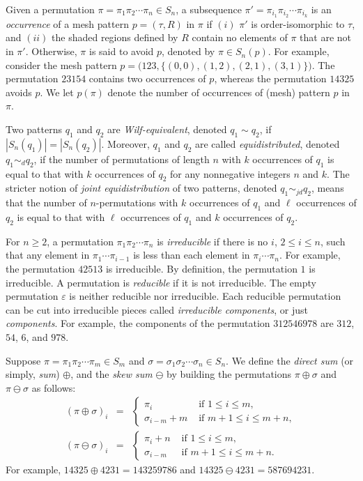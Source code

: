 \documentclass[12pt]{article}
\begin{document}
Given a permutation $\pi = \pi_1 \pi_2 \cdots \pi_n \in S_n$, a subsequence $\pi' = \pi_{i_1} \pi_{i_2} \cdots \pi_{i_k}$ is an \emph{occurrence} of a mesh pattern $p = (\tau, R)$ in $\pi$ if $(i)$ $\pi'$ is order-isomorphic to $\tau$, and $(ii)$ the shaded regions defined by $R$ contain no elements of $\pi$ that are not in $\pi'$.
Otherwise, $\pi$ is said to avoid $p$, denoted by $\pi \in S_n(p)$. 
For example, consider the mesh pattern $p = \big(123, \{(0,0),(1,2),(2,1),(3,1)\}\big)$.
The permutation $23154$ contains two occurrences of $p$, whereas the permutation $14325$ avoids $p$. We let $p(\pi)$ denote the number of occurrences of (mesh) pattern $p$ in $\pi$.

Two patterns $q_1$ and $q_2$ are {\em Wilf-equivalent}, denoted $q_1\sim q_2$, if  $|S_n(q_1)|=|S_n(q_2)|$. Moreover, $q_1$ and $q_2$ are called {\em equidistributed}, denoted~$q_1\sim_d q_2$, 
if the number of permutations of length $n$ with $k$ occurrences of $q_1$ is equal to that with $k$ occurrences of $q_2$ for any nonnegative integers $n$ and $k$. 
The stricter notion of \textit{joint equidistribution} of two patterns, denoted $q_1\sim_{jd}q_2$, means that the number of $n$-permutations with $k$ occurrences of $q_1$ and $\ell$ occurrences of $q_2$ is equal to that with $\ell$  occurrences of $q_1$ and $k$ occurrences of $q_2$. 

For $n \ge 2$, a permutation $\pi_1 \pi_2 \cdots \pi_n$ is \textit{irreducible} if there is no $i$, 
$2 \le i \le n$, such that any element in $\pi_1 \cdots \pi_{i-1}$ is less than each element in 
$\pi_i \cdots \pi_n$. For example, the permutation $42513$ is irreducible. By definition, the permutation $1$ is irreducible. A permutation is \textit{reducible} if it is not irreducible. The empty permutation $\varepsilon$ is neither reducible nor irreducible. Each reducible permutation can be cut into irreducible pieces called 
\textit{irreducible components}, or just \textit{components}. For example, the components of the permutation $312546978$ are $312$, $54$, $6$, and $978$.

Suppose $\pi=\pi_1\pi_2\cdots\pi_m \in S_m$ and $\sigma=\sigma_1\sigma_2\cdots\sigma_n\in S_n$. We define the {\em direct sum} (or simply, {\em sum}) $\oplus$, and the {\em skew sum} $\ominus$ by building the permutations $\pi\oplus\sigma$ and $\pi\ominus\sigma$ as follows:
\begin{eqnarray*}
(\pi\oplus\sigma)_i&=& \left\{
\begin{array}{ll}
\pi_i  &  \mbox{ if }1\leq i\leq m,\\
\sigma_{i-m}+m & \mbox{ if }m+1\leq i\leq m+n,
\end{array}\right.\nonumber \\
(\pi\ominus\sigma)_i &=& \left\{
\begin{array}{ll}
\pi_i+n  &  \mbox{ if }1\leq i\leq m,\\
\sigma_{i-m} & \mbox{ if }m+1\leq i\leq m+n.
\end{array}\right.\nonumber
\end{eqnarray*}
For example, $14325\oplus 4231=143259786$ and $14325\ominus 4231= 587694231$. 
\end{document}
